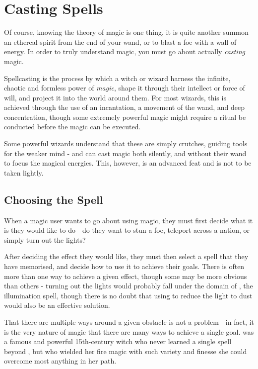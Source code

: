 

\chapter{Casting Spells}

Of course, knowing the theory of magic is one thing, it is quite another summon an ethereal spirit from the end of your wand, or to blast a foe with a wall of energy. In order to truly understand magic, you must go about actually {\it casting} magic. 

Spellcasting is the process by which a witch or wizard harness the infinite, chaotic and formless power of {\it magic}, shape it through their intellect or force of will, and project it into the world around them. For most wizards, this is achieved through the use of an incantation, a movement of the wand, and deep concentration, though some extremely powerful magic might require a ritual be conducted before the magic can be executed. 

Some powerful wizards understand that these are simply crutches, guiding tools for the weaker mind - and can cast magic both silently, and without their wand to focus the magical energies. This, however, is an advanced feat and is not to be taken lightly. 

\section{Choosing the Spell}

When a magic user wants to go about using magic, they must first decide what it is they would like to do - do they want to stun a foe, teleport across a nation, or simply turn out the lights?

After deciding the effect they would like, they must then select a spell that they have memorised, and decide how to use it to achieve their goals. There is often more than one way to achieve a given effect, though some may be more obvious than others - turning out the lights would probably fall under the domain of , the illumination spell, though there is no doubt that using  to reduce the light to dust would also be an effective solution. 

That there are multiple ways around a given obstacle is not a problem - in fact, it is the very nature of magic that there are many ways to achieve a single goal.  was a famous and powerful 15th-century witch who never learned a single spell beyond , but who wielded her fire magic with such variety and finesse she could overcome most anything in her path. 

